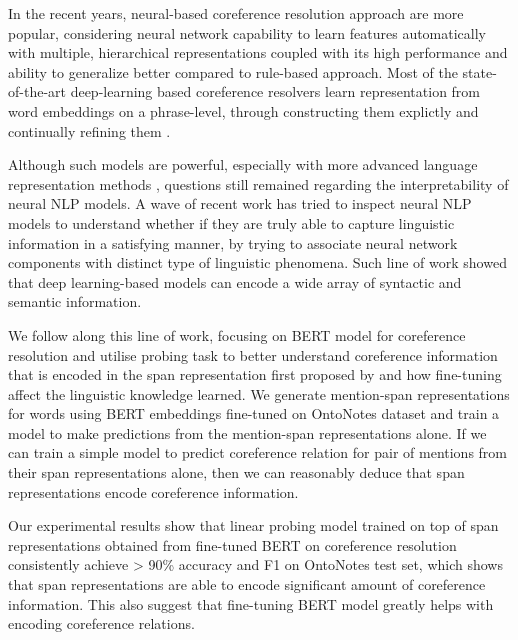\documentclass[11pt]{article}
\begin{document}
In the recent years, neural-based coreference resolution approach are more popular, considering neural network capability to learn features automatically with multiple, hierarchical representations coupled with its high performance and ability to generalize better compared to rule-based approach. Most of the state-of-the-art deep-learning based coreference resolvers learn representation from word embeddings on a phrase-level, through constructing them explictly \parencite{lee2017end} and continually refining them \parencite{lee2018higher,kantor-globerson-2019-coreference}.

Although such models are powerful, especially with more advanced language representation methods \parencite{devlin2019bert,peters2018elmo}, questions still remained regarding the interpretability of neural NLP models. A wave of recent work has tried to inspect neural NLP models to understand whether if they are truly able to capture linguistic information in a satisfying manner, by trying to associate neural network components with distinct type of linguistic phenomena. Such line of work \parencite{shi2016string,liu2019linguistic,tenney2019context} showed that deep learning-based models can encode a wide array of syntactic and semantic information. 

We follow along this line of work, focusing on BERT model for coreference resolution \parencite{joshi2019coref} and utilise probing task \parencite{tenney2019context,liu2019linguistic} to better understand coreference information that is encoded in the span representation first proposed by \parencite{lee2017end} and how fine-tuning affect the linguistic knowledge learned. We generate mention-span representations for words using BERT embeddings fine-tuned on OntoNotes dataset \parencite{conll} and train a model to make predictions from the mention-span representations alone. If we can train a simple model to predict coreference relation for pair of mentions from their span representations alone, then we can reasonably deduce that span representations encode coreference information.

Our experimental results show that linear probing model trained on top of span representations obtained from fine-tuned BERT on coreference resolution consistently achieve > 90\% accuracy and F1 on OntoNotes test set, which shows that span representations are able to encode significant amount of coreference information. This also suggest that fine-tuning BERT model greatly helps with encoding coreference relations.
\end{document}
